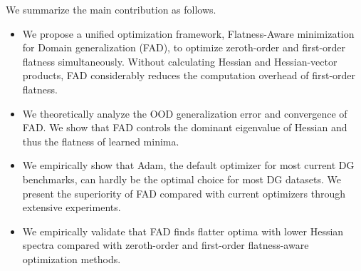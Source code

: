 We summarize the main contribution as follows.
\begin{itemize}[noitemsep,topsep=0pt,parsep=0pt,partopsep=0pt]
    \item We propose a unified optimization framework, Flatness-Aware minimization for Domain generalization (FAD), to optimize zeroth-order and first-order flatness simultaneously. Without calculating Hessian and Hessian-vector products, FAD considerably reduces the computation overhead of first-order flatness.
    \item We theoretically analyze the OOD generalization error and convergence of FAD. We show that FAD controls the dominant eigenvalue of Hessian and thus the flatness of learned minima.
    \item We empirically show that Adam, the default optimizer for most current DG benchmarks, can hardly be the optimal choice for most DG datasets. We present the superiority of FAD compared with current optimizers through extensive experiments.
    \item We empirically validate that FAD finds flatter optima with lower Hessian spectra compared with zeroth-order and first-order flatness-aware optimization methods.
\end{itemize}







 